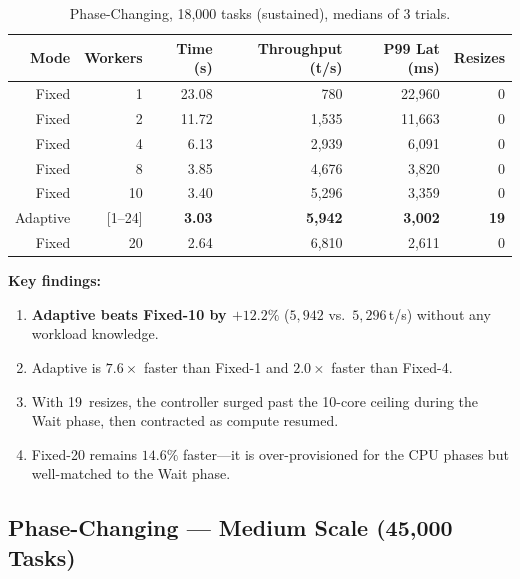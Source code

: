 \documentclass[12pt,a4paper]{article}
\begin{document}
\begin{table}[H]
\centering
\caption{Phase-Changing, 18,000 tasks (sustained), medians of 3 trials.}
\begin{tabular}{rrrrrr}
\toprule
\textbf{Mode} & \textbf{Workers} & \textbf{Time (s)}
  & \textbf{Throughput (t/s)} & \textbf{P99 Lat (ms)} & \textbf{Resizes} \\
\midrule
Fixed &  1 & 23.08 &   780 & 22,960 & 0 \\
Fixed &  2 & 11.72 & 1,535 & 11,663 & 0 \\
Fixed &  4 &  6.13 & 2,939 &  6,091 & 0 \\
Fixed &  8 &  3.85 & 4,676 &  3,820 & 0 \\
Fixed & 10 &  3.40 & 5,296 &  3,359 & 0 \\
\rowcolor{rowblue}
Adaptive & [1--24] & \textbf{3.03} & \textbf{5,942}
  & \textbf{3,002} & \textbf{19} \\
Fixed & 20 &  2.64 & 6,810 &  2,611 & 0 \\
\bottomrule
\end{tabular}
\label{tab:phase_sustained}
\end{table}

\textbf{Key findings:}
\begin{enumerate}
  \item \textbf{Adaptive beats Fixed-10 by $+12.2\%$} ($5,942$ vs.\
        $5,296$\,t/s) without any workload knowledge.
  \item Adaptive is $7.6\times$ faster than Fixed-1 and $2.0\times$ faster
        than Fixed-4.
  \item With 19~resizes, the controller surged past the 10-core ceiling
        during the Wait phase, then contracted as compute resumed.
  \item Fixed-20 remains $14.6\%$ faster---it is over-provisioned for the
        CPU phases but well-matched to the Wait phase.
\end{enumerate}

\subsection{Phase-Changing --- Medium Scale (45,000 Tasks)}
\end{document}
